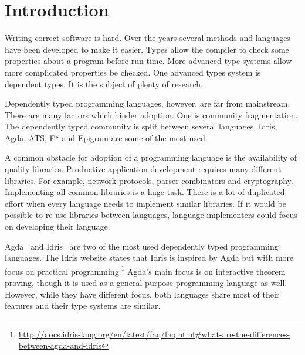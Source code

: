 \chapter{Introduction}

Writing correct software is hard. Over the years several methods and languages
have been developed to make it easier. Types allow the compiler to check some
properties about a program before run-time. More advanced type systems allow
more complicated properties be checked.
One advanced types system is dependent types. It is the subject of plenty
of research.

Dependently typed programming languages, however, are far from mainstream.
There are many factors which hinder adoption. One is community fragmentation.
The dependently typed community is split between several languages.
Idris, Agda, ATS, F* and Epigram are some of the most used.

A common obstacle for adoption of a programming language is the
availability of quality libraries. Productive application development requires
many different libraries.  For example, network protocols, parser combinators
and cryptography.  Implementing all common libraries is a huge task.  There is
a lot of duplicated effort when every language needs to implement similar
libraries.  If it would be possible to re-use libraries between languages,
language implementers could focus on developing their language.

Agda~\cite{agda} and Idris~\cite{idris} are two of the most used dependently
typed programming languages.
The Idris website states that Idris is inspired
by Agda but with more focus on practical
programming.\footnote{\url{http://docs.idris-lang.org/en/latest/faq/faq.html\#what-are-the-differences-between-agda-and-idris}}
Agda's main focus is on interactive theorem proving, though it is used as
a general purpose programming language as well.  However, while they have
different focus, both languages share most of their features and their type
systems are similar.

